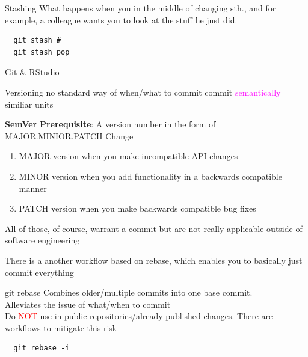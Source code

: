 \documentclass{beamer}
\begin{document}
\begin{frame}[fragile,t]{Stashing}\vspace{10pt}
  What happens when you in the middle of changing sth., and for example, a colleague wants you to look at the stuff he just did.
  \begin{lstlisting}
  git stash #
  git stash pop\end{lstlisting}
\end{frame}


\begin{frame}[fragile,t]{Git \& RStudio}\vspace{10pt}
\end{frame}

\begin{frame}[fragile,t]{Versioning}\vspace{10pt}
  no standard way of when/what to commit
  commit \textcolor{magenta}{semantically} similiar units\vspace{10pt}

  \textbf{SemVer}
  \textbf{Prerequisite}: A version number in the form of MAJOR.MINIOR.PATCH
  Change 
  \begin{enumerate}
      \item MAJOR version when you make incompatible API changes
      \item MINOR version when you add functionality in a backwards compatible manner
      \item PATCH version when you make backwards compatible bug fixes
  \end{enumerate}\vspace{10pt}
  All of those, of course, warrant a commit but are not really applicable outside of software engineering

  There is a another workflow based on rebase, which enables you to basically just commit everything%
\end{frame}

\begin{frame}[fragile,t]{git rebase}\vspace{10pt}
  Combines older/multiple commits into one base commit.\vspace{10pt}\\
  Alleviates the issue of what/when to commit\vspace{10pt}\\
  Do \textcolor{red}{NOT} use in public repositories/already published changes. There are workflows to mitigate this risk

  \begin{lstlisting}
  git rebase -i\end{lstlisting}

\end{frame}
\end{document}
